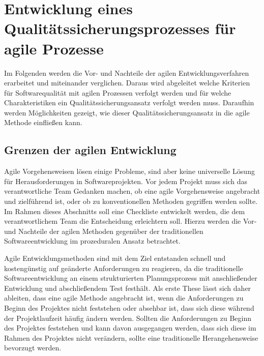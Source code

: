 \chapter{Entwicklung eines Qualitätssicherungsprozesses für agile Prozesse}
\label{cha:prozessentwicklung}

    Im Folgenden werden die Vor- und Nachteile der agilen Entwicklungsverfahren erarbeitet und miteinander verglichen. Daraus wird abgeleitet welche Kriterien für Softwarequalität mit agilen Prozessen verfolgt werden und für welche Charakteristiken ein Qualitätssicherungsansatz verfolgt werden muss. Daraufhin werden Möglichkeiten gezeigt, wie dieser Qualitätssicherungsansatz in die agile Methode einfließen kann.

    \section{Grenzen der agilen Entwicklung}

        Agile Vorgehensweisen lösen einige Probleme, sind aber keine universelle Lösung für Herausforderungen in Softwareprojekten. Vor jedem Projekt muss sich das verantwortliche Team Gedanken machen, ob eine agile Vorgehensweise angebracht und zielführend ist, oder ob zu konventionellen Methoden gegriffen werden sollte. Im Rahmen dieses Abschnitts soll eine Checkliste entwickelt werden, die dem verantwortlichem Team die Entscheidung erleichtern soll. Hierzu werden die Vor- und Nachteile der agilen Methoden gegenüber der traditionellen Softwareentwicklung im prozeduralen Ansatz betrachtet.

        Agile Entwicklungsmethoden sind mit dem Ziel entstanden schnell und kostengünstig auf geänderte Anforderungen zu reagieren, da die traditionelle Softwareentwicklung an einem strukturierten Planungsprozess mit anschließender Entwicklung und abschließendem Test festhält. Als erste These lässt sich daher ableiten, dass eine agile Methode angebracht ist, wenn die Anforderungen zu Beginn des Projektes nicht feststehen oder absehbar ist, dass sich diese während der Projektlaufzeit häufig ändern werden.
        Sollten die Anforderungen zu Beginn des Projektes feststehen und kann davon ausgegangen werden, dass sich diese im Rahmen des Projektes nicht verändern, sollte eine traditionelle Herangehensweise bevorzugt werden.

